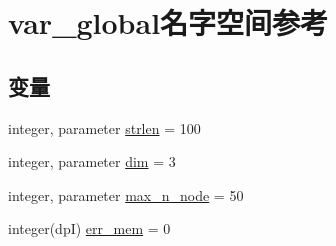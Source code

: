 \hypertarget{namespacevar__global}{
\section{var\_\-global名字空间参考}
\label{namespacevar__global}
}
\subsection*{变量}
\begin{DoxyCompactItemize}
\item 
integer, parameter \hyperlink{namespacevar__global_afc73e7807a439bf3bc26589423ae3c91}{strlen} = 100
\item 
integer, parameter \hyperlink{namespacevar__global_a6f0b7961ebb0eb949c22bc56c0b4065b}{dim} = 3
\item 
integer, parameter \hyperlink{namespacevar__global_aaf3293fc78e326c60e3239dd8b665cb7}{max\_\-n\_\-node} = 50
\item 
integer(dpI) \hyperlink{namespacevar__global_a5991406705b67a341f8f8b4619c270b4}{err\_\-mem} = 0
\end{DoxyCompactItemize}


